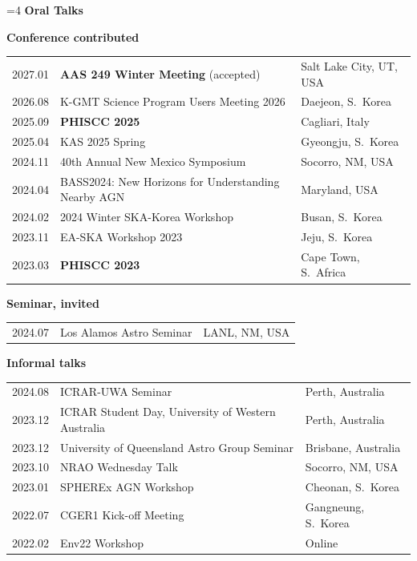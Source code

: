 \documentclass[11pt,a4paper]{article}
\newcommand{\cvneedspace}[1]{%
  \dimen0=#1\relax
  \ifdim\pagegoal=\maxdimen\else
    \ifdim\dimen0>\dimexpr\pagegoal-\pagetotal\relax\newpage\fi
  \fi}
\newcommand{\cvsubsection}[1]{%
  \cvneedspace{4\baselineskip}%
  \vspace{0.6ex}\noindent\hspace*{0.6em}%
  {\color{darkgreen}\raisebox{0.1em}{\rule{0.35em}{0.35em}}\hspace{0.5em}\textbf{#1}}%
  \par\vspace{0.6ex}\nopagebreak}
\newcommand{\cvsubsub}[1]{%
  \vspace{0.4ex}\noindent\hspace*{1.8em}%
  {\color{persongreen}\textbullet\hspace{0.45em}\textbf{#1}}%
  \par\vspace{0.3ex}\nopagebreak}
\begin{document}
\cvsubsection{Oral Talks}
\cvsubsub{Conference contributed}
{\small
\begin{longtable}{@{}L{0.10\textwidth}L{0.58\textwidth}L{0.26\textwidth}@{}}
  2027.01 & \textbf{AAS 249 Winter Meeting} (accepted) & Salt Lake City, UT, USA \\
  2026.08 & K-GMT Science Program Users Meeting 2026 & Daejeon, S.\ Korea \\
  2025.09 & \textbf{PHISCC 2025} & Cagliari, Italy \\
  2025.04 & KAS 2025 Spring & Gyeongju, S.\ Korea \\
  2024.11 & 40th Annual New Mexico Symposium & Socorro, NM, USA \\
  2024.04 & BASS2024: New Horizons for Understanding Nearby AGN & Maryland, USA \\
  2024.02 & 2024 Winter SKA-Korea Workshop & Busan, S.\ Korea \\
  2023.11 & EA-SKA Workshop 2023 & Jeju, S.\ Korea \\
  2023.03 & \textbf{PHISCC 2023} & Cape Town, S.\ Africa \\
\end{longtable}}
\cvsubsub{Seminar, invited}
{\small
\begin{longtable}{@{}L{0.10\textwidth}L{0.58\textwidth}L{0.26\textwidth}@{}}
  2024.07 & Los Alamos Astro Seminar & LANL, NM, USA \\
\end{longtable}}
\cvsubsub{Informal talks}
{\small
\begin{longtable}{@{}L{0.10\textwidth}L{0.58\textwidth}L{0.26\textwidth}@{}}
  2024.08 & ICRAR-UWA Seminar & Perth, Australia \\
  2023.12 & ICRAR Student Day, University of Western Australia & Perth, Australia \\
  2023.12 & University of Queensland Astro Group Seminar & Brisbane, Australia \\
  2023.10 & NRAO Wednesday Talk & Socorro, NM, USA \\
  2023.01 & SPHEREx AGN Workshop & Cheonan, S.\ Korea \\
  2022.07 & CGER1 Kick-off Meeting & Gangneung, S.\ Korea \\
  2022.02 & Env22 Workshop & Online \\
\end{longtable}}
\end{document}
